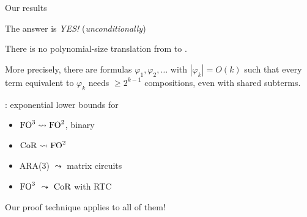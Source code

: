 \begin{frame}{Our results}

{\Large The answer is \emph{YES!}} \quad (\emph{unconditionally})
\begin{theorem}
\label{thm:main}
\large
There is no polynomial-size translation from \FOthree{} to \CoR{}.
\pause

\normalfont
More precisely, there are \FOthree{} formulas $\varphi_1, \varphi_2, \dots$ with $|\varphi_k| = O(k)$
such that every \CoR{} term equivalent to $\varphi_k$ needs $\ge 2^{k-1}$ compositions,
even with shared subterms.
\end{theorem}

\vfill
\pause
{\large
{}: exponential lower bounds for
\begin{itemize}\setlength{\itemsep}{0pt}
  \item $\mathrm{FO}^{3} \leadsto \mathrm{FO}^{2}$, binary
    \quad {}
  \item $\mathrm{CoR}{} \leadsto \mathrm{FO}^{2}$
  \pause
  \item ARA(3) $\leadsto$ matrix circuits
    \quad {}
  \pause
  \item $\mathrm{FO}^{3}$ $\leadsto$ $\mathrm{CoR}{}$ with RTC 
\end{itemize}}

\vfill
Our proof technique applies to all of them!

\end{frame}

